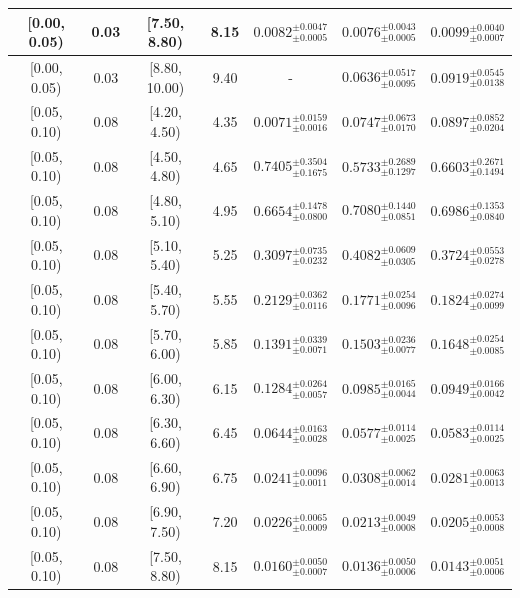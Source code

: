 \begin{longtable}{|c|c|c|c|c|c|c|}
\hline
[0.00, 0.05) & 0.03 & [7.50, 8.80) & 8.15 & $0.0082^{ \pm 0.0047 }_{ \pm 0.0005 }$ & $0.0076^{ \pm 0.0043 }_{ \pm 0.0005 }$ & $0.0099^{ \pm 0.0040 }_{ \pm 0.0007 }$ \\ 
\hline
[0.00, 0.05) & 0.03 & [8.80, 10.00) & 9.40 & - & $0.0636^{ \pm 0.0517 }_{ \pm 0.0095 }$ & $0.0919^{ \pm 0.0545 }_{ \pm 0.0138 }$ \\ 
\hline
[0.05, 0.10) & 0.08 & [4.20, 4.50) & 4.35 & $0.0071^{ \pm 0.0159 }_{ \pm 0.0016 }$ & $0.0747^{ \pm 0.0673 }_{ \pm 0.0170 }$ & $0.0897^{ \pm 0.0852 }_{ \pm 0.0204 }$ \\ 
\hline
[0.05, 0.10) & 0.08 & [4.50, 4.80) & 4.65 & $0.7405^{ \pm 0.3504 }_{ \pm 0.1675 }$ & $0.5733^{ \pm 0.2689 }_{ \pm 0.1297 }$ & $0.6603^{ \pm 0.2671 }_{ \pm 0.1494 }$ \\ 
\hline
[0.05, 0.10) & 0.08 & [4.80, 5.10) & 4.95 & $0.6654^{ \pm 0.1478 }_{ \pm 0.0800 }$ & $0.7080^{ \pm 0.1440 }_{ \pm 0.0851 }$ & $0.6986^{ \pm 0.1353 }_{ \pm 0.0840 }$ \\ 
\hline
[0.05, 0.10) & 0.08 & [5.10, 5.40) & 5.25 & $0.3097^{ \pm 0.0735 }_{ \pm 0.0232 }$ & $0.4082^{ \pm 0.0609 }_{ \pm 0.0305 }$ & $0.3724^{ \pm 0.0553 }_{ \pm 0.0278 }$ \\ 
\hline
[0.05, 0.10) & 0.08 & [5.40, 5.70) & 5.55 & $0.2129^{ \pm 0.0362 }_{ \pm 0.0116 }$ & $0.1771^{ \pm 0.0254 }_{ \pm 0.0096 }$ & $0.1824^{ \pm 0.0274 }_{ \pm 0.0099 }$ \\ 
\hline
[0.05, 0.10) & 0.08 & [5.70, 6.00) & 5.85 & $0.1391^{ \pm 0.0339 }_{ \pm 0.0071 }$ & $0.1503^{ \pm 0.0236 }_{ \pm 0.0077 }$ & $0.1648^{ \pm 0.0254 }_{ \pm 0.0085 }$ \\ 
\hline
[0.05, 0.10) & 0.08 & [6.00, 6.30) & 6.15 & $0.1284^{ \pm 0.0264 }_{ \pm 0.0057 }$ & $0.0985^{ \pm 0.0165 }_{ \pm 0.0044 }$ & $0.0949^{ \pm 0.0166 }_{ \pm 0.0042 }$ \\ 
\hline
[0.05, 0.10) & 0.08 & [6.30, 6.60) & 6.45 & $0.0644^{ \pm 0.0163 }_{ \pm 0.0028 }$ & $0.0577^{ \pm 0.0114 }_{ \pm 0.0025 }$ & $0.0583^{ \pm 0.0114 }_{ \pm 0.0025 }$ \\ 
\hline
[0.05, 0.10) & 0.08 & [6.60, 6.90) & 6.75 & $0.0241^{ \pm 0.0096 }_{ \pm 0.0011 }$ & $0.0308^{ \pm 0.0062 }_{ \pm 0.0014 }$ & $0.0281^{ \pm 0.0063 }_{ \pm 0.0013 }$ \\ 
\hline
[0.05, 0.10) & 0.08 & [6.90, 7.50) & 7.20 & $0.0226^{ \pm 0.0065 }_{ \pm 0.0009 }$ & $0.0213^{ \pm 0.0049 }_{ \pm 0.0008 }$ & $0.0205^{ \pm 0.0053 }_{ \pm 0.0008 }$ \\ 
\hline
[0.05, 0.10) & 0.08 & [7.50, 8.80) & 8.15 & $0.0160^{ \pm 0.0050 }_{ \pm 0.0007 }$ & $0.0136^{ \pm 0.0050 }_{ \pm 0.0006 }$ & $0.0143^{ \pm 0.0051 }_{ \pm 0.0006 }$ \\ 

\end{longtable}
